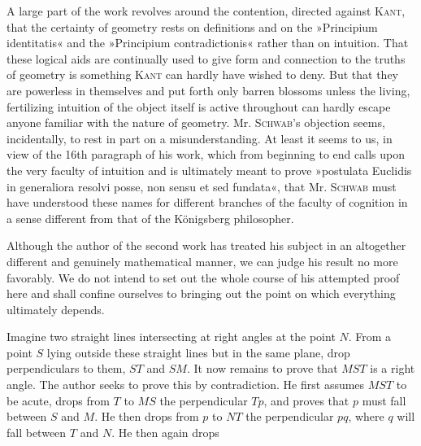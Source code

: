 A large part of the work revolves around the contention, directed against \textsc{Kant}, that
the certainty of geometry rests on definitions and on the
»Principium identitatis« and the »Principium contradictionis« rather than on intuition. That these
logical aids are continually used to give form and connection to the truths of geometry
is something \textsc{Kant} can hardly have wished to deny. But that
they are powerless in themselves and put forth only barren blossoms unless the
living, fertilizing intuition of the object itself is active throughout can hardly escape anyone
familiar with the nature of geometry. Mr. \textsc{Schwab}'s objection
seems, incidentally, to rest in part on a misunderstanding. At least it seems to us, in view of
the 16th paragraph of his work, which from beginning to end calls upon the very
faculty of intuition and is ultimately meant to prove »postulata Euclidis in
generaliora resolvi posse, non sensu et  sed  fundata«, that Mr.
\textsc{Schwab} must have understood these names for different branches of the faculty of cognition
in a sense different from that of the Königsberg philosopher.

Although the author of the second work has treated his subject in an altogether different and
genuinely mathematical manner, we can judge his result
no more favorably. We do not intend to set out the whole course of his
attempted proof here and shall confine ourselves to bringing out the point on which
everything ultimately depends.

\begin{center}\end{center}

Imagine two straight lines intersecting at right angles at the point $N$.
From a point $S$ lying outside these straight lines but in the same
plane, drop perpendiculars to them, $ST$ and $SM$. It now remains to prove
that $MST$ is a right angle. The author seeks to prove this by contradiction.
He first assumes $MST$ to be acute, drops from $T$ to $MS$ the perpendicular $Tp$, and
proves that $p$ must fall between $S$ and $M$. He then drops from $p$ to $NT$ the perpendicular $pq$, where $q$ will fall between $T$ and $N$. He then again drops
